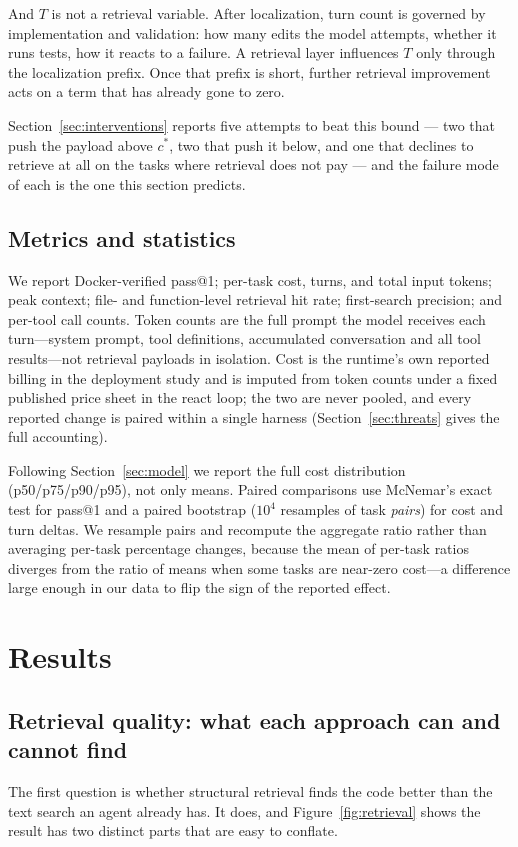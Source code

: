 \documentclass[11pt,letterpaper]{article}
\begin{document}
And $T$ is not a retrieval variable. After localization, turn count is governed by
implementation and validation: how many edits the model attempts, whether it runs
tests, how it reacts to a failure. A retrieval layer influences $T$ only through
the localization prefix. Once that prefix is short, further retrieval improvement
acts on a term that has already gone to zero.

Section~\ref{sec:interventions} reports five attempts to beat this bound --- two
that push the payload above $c^{*}$, two that push it below, and one that declines
to retrieve at all on the tasks where retrieval does not pay --- and the failure
mode of each is the one this section predicts.

\subsection{Metrics and statistics}
We report Docker-verified pass@1; per-task cost, turns, and total input tokens;
peak context; file- and function-level retrieval hit rate; first-search
precision; and per-tool call counts. Token counts are the full prompt the model
receives each turn---system prompt, tool definitions, accumulated conversation and
all tool results---not retrieval payloads in isolation. Cost is the runtime's own
reported billing in the deployment study and is imputed from token counts under a
fixed published price sheet in the react loop; the two are never pooled, and every
reported change is paired within a single harness
(Section~\ref{sec:threats} gives the full accounting).

Following Section~\ref{sec:model} we report the full cost distribution
(p50/p75/p90/p95), not only means. Paired comparisons use McNemar's exact test
for pass@1 and a paired bootstrap ($10^4$ resamples of task \emph{pairs}) for
cost and turn deltas. We resample pairs and recompute the aggregate ratio rather
than averaging per-task percentage changes, because the mean of per-task ratios
diverges from the ratio of means when some tasks are near-zero cost---a
difference large enough in our data to flip the sign of the reported effect.

\section{Results}

\subsection{Retrieval quality: what each approach can and cannot find}
The first question is whether structural retrieval finds the code better than the
text search an agent already has. It does, and Figure~\ref{fig:retrieval} shows
the result has two distinct parts that are easy to conflate.
\end{document}
